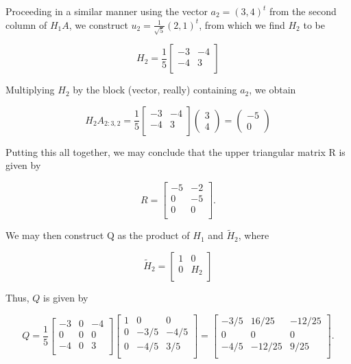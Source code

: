 \documentclass[a4paper, 12pt, twoside]{article}
\begin{document}
Proceeding in a similar manner using the vector $a_2 = (3,4)^t$ from the second column of $H_1A$, we construct $u_2 = \frac{1}{\sqrt{5}} (2,1)^t$, from which we find $H_2$ to be

$$
H_2 = \frac{1}{5}
\begin{bmatrix}
-3 & -4 \\
-4 & 3 \\
\end{bmatrix}
$$ 

Multiplying $H_2$ by the block (vector, really) containing $a_2$, we obtain

$$
H_2A_{2:3,2} =
\frac{1}{5}
\begin{bmatrix}
-3 & -4 \\
-4 & 3 \\
\end{bmatrix}
\begin{pmatrix}
3 \\ 4
\end{pmatrix}
=
\begin{pmatrix}
-5 \\ 0
\end{pmatrix}
$$

Putting this all together, we may conclude that the upper triangular matrix R is given by

$$
R = 
\begin{bmatrix}
-5 & -2 \\
0 & -5 \\
0 & 0 \\
\end{bmatrix}.
$$

We may then construct Q as the product of $H_1$ and $\tilde{H}_2$, where 

$$
\tilde{H}_2 = \begin{bmatrix} 1 & 0 \\ 0 & H_2\\ \end{bmatrix}
$$

Thus, $Q$ is given by

$$
Q = 
\frac{1}{5}
\begin{bmatrix}
-3 & 0 & -4 \\
0 & 0 & 0 \\
-4 & 0 & 3 \\
\end{bmatrix}
\begin{bmatrix}
1 & 0 & 0 \\
0 &-3/5 & -4/5 \\
0 &-4/5 & 3/5 \\
\end{bmatrix}
=
\begin{bmatrix}
-3/5 & 16/25 & -12/25 \\
0 &0 &0 \\
-4/5& -12/25 & 9/25 \\
\end{bmatrix}.
$$
\end{document}
